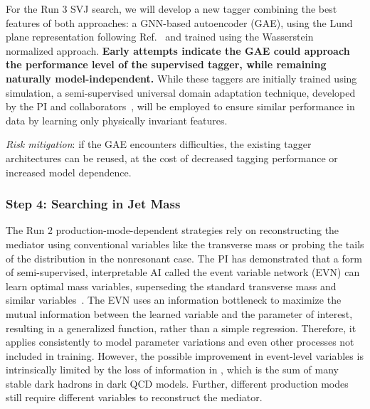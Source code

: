 For the Run 3 SVJ search, we will develop a new tagger combining the best features of both approaches:
a GNN-based autoencoder (GAE), using the Lund plane representation following Ref.~\cite{Dreyer:2020brq} and trained using the Wasserstein normalized approach.
\textbf{Early attempts indicate the GAE could approach the performance level of the supervised tagger, while remaining naturally model-independent.}
While these taggers are initially trained using simulation,
a semi-supervised universal domain adaptation technique, developed by the PI and collaborators~\cite{Ciprijanovic:2023hrw},
will be employed to ensure similar performance in data by learning only physically invariant features.

\textit{Risk mitigation}: if the GAE encounters difficulties, the existing tagger architectures can be reused, at the cost of decreased tagging performance or increased model dependence.

\subsubsection{Step 4: Searching in Jet Mass}\label{subsec:strategy}

The Run 2 production-mode-dependent strategies rely on reconstructing the mediator using conventional variables like the transverse mass
or probing the tails of the \ptmiss distribution in the nonresonant case.
The PI has demonstrated that a form of semi-supervised, interpretable AI called the event variable network (EVN)
can learn optimal mass variables, superseding the standard transverse mass and similar variables~\cite{Pedro:2023sdp}.
The EVN uses an information bottleneck to maximize the mutual information between the learned variable and the parameter of interest,
resulting in a generalized function, rather than a simple regression.
Therefore, it applies consistently to model parameter variations and even other processes not included in training.
However, the possible improvement in event-level variables is intrinsically limited by the loss of information in \ptmiss,
which is the sum of many stable dark hadrons in dark QCD models.
Further, different production modes still require different variables to reconstruct the mediator.

